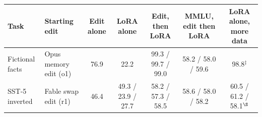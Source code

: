 \begin{tabular}{llccccc}
\toprule
Task & Starting edit & Edit alone & LoRA alone & Edit, then LoRA & MMLU, edit then LoRA & LoRA alone, more data \\
\midrule
Fictional facts & Opus memory edit (o1) & 76.9 & 22.2 & 99.3 / 99.7 / 99.0 & 58.2 / 58.0 / 59.6 & 98.8$^\ddagger$ \\
SST-5 inverted & Fable swap edit (r1) & 46.4 & 49.3 / 23.9 / 27.7 & 58.2 / 57.3 / 58.5 & 58.6 / 58.0 / 58.2 & 60.5 / 61.2 / 58.1$^\S$ \\
\bottomrule
\end{tabular}
